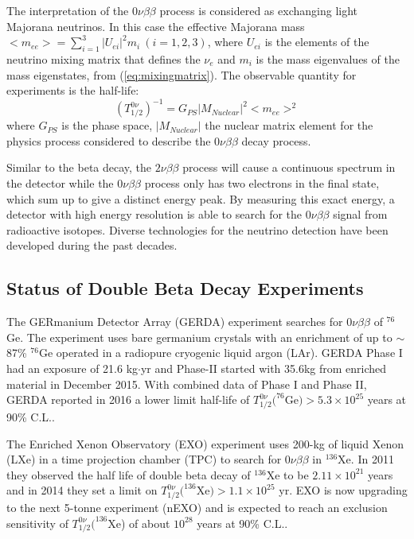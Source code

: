 \documentclass[preprint,12pt]{elsarticle}
\numberwithin{equation}{section}
\begin{document}
The interpretation of the $0\nu\beta\beta$ process is considered as exchanging light Majorana neutrinos. In this case the effective Majorana mass $<m_{ee}>=\sum_{i=1}^{3} |U_{ei}|^2m_i~(i=1,2,3)$, where $U_{ei}$ is the elements of the neutrino mixing matrix that defines the $\nu_e$ and $m_i$ is the mass eigenvalues of the mass eigenstates, from (\ref{eq:mixingmatrix}). The observable quantity for experiments is the half-life:
\[
(T^{0\nu}_{1/2})^{-1} = G_{PS}|M_{Nuclear}|^2<m_{ee}>^2 
\]
where $G_{PS}$ is the phase space, $|M_{Nuclear}|$ the nuclear matrix element for the physics process considered to describe the $0\nu\beta\beta$ decay process\cite{kaizuber}.

Similar to the beta decay, the $2\nu\beta\beta$ process will cause a continuous spectrum in the detector while the $0\nu\beta\beta$ process only has two electrons in the final state, which sum up to give a distinct energy peak. By measuring this exact energy, a detector with high energy resolution is able to search for the $0\nu\beta\beta$ signal from radioactive isotopes. Diverse technologies for the neutrino detection have been developed during the past decades.

\subsection{Status of Double Beta Decay Experiments}
The GERmanium Detector Array (GERDA) experiment searches for $0\nu\beta\beta$ of $^{76}$Ge. The experiment uses bare germanium crystals with an enrichment of up to $\sim$87\% $^{76}$Ge operated in a radiopure cryogenic liquid argon (LAr). GERDA Phase I had an exposure of 21.6 kg$\cdot$yr and Phase-II started with 35.6kg from enriched material in December 2015. With combined data of Phase I and Phase II, GERDA reported in 2016 a lower limit half-life of $T^{0\nu}_{1/2}(^{76}$Ge$)>5.3\times 10^{25}$ years at 90\% C.L.\cite{gerda,gerda2}.

The Enriched Xenon Observatory (EXO) experiment uses 200-kg of liquid Xenon (LXe) in a time projection chamber (TPC) to search for $0\nu\beta\beta$ in $^{136}$Xe. In 2011 they observed the half life of double beta decay of $^{136}$Xe to be $2.11\times 10^{21}$ years and in 2014 they set a limit on $T^{0\nu}_{1/2}(^{136}$Xe$)>1.1\times 10^{25}$ yr\cite{exo}. EXO is now upgrading to the next 5-tonne experiment (nEXO) and is expected to reach an exclusion sensitivity of $T^{0\nu}_{1/2}(^{136}$Xe) of about $10^{28}$ years at 90\% C.L.\cite{nEXO}.
\end{document}
